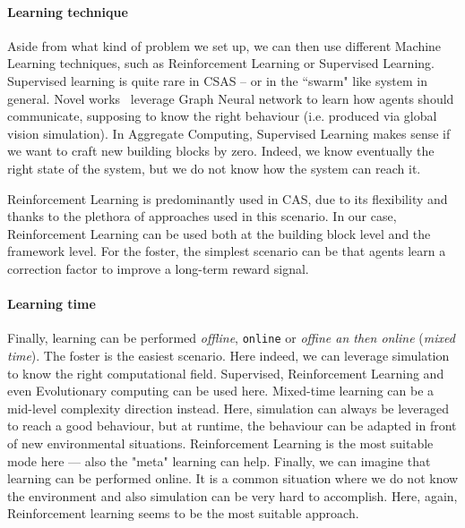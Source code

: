 \documentclass[conference]{IEEEtran}
\begin{document}
\paragraph{Learning technique}
Aside from what kind of problem we set up, we can then use different Machine Learning techniques,
 such as Reinforcement Learning or Supervised Learning.
%
Supervised learning is quite rare in CSAS -- or in the ``swarm" like system in general.
%
Novel works~\cite{DBLP:conf/corl/TolstayaGPP0R19} leverage Graph Neural network to learn how agents should communicate, supposing to know the right behaviour (i.e. produced via global vision simulation).
%
In Aggregate Computing, Supervised Learning makes sense if we want to craft new building blocks by zero. 
% 
Indeed, we know eventually the right state of the system, but we do not know how the system can reach it.

Reinforcement Learning is predominantly used in CAS, 
 due to its flexibility and thanks to the plethora of approaches used in this scenario.
% 
In our case, Reinforcement Learning can be used both at the building block level and the framework level.
%
For the foster, the simplest scenario can be that agents learn a correction factor to improve a long-term reward signal.
 
\paragraph{Learning time}
Finally, learning can be performed \textit{offline}, \texttt{online} or \textit{offine an then online} (\textit{mixed time}).
% 
The foster is the easiest scenario.
 Here indeed, we can leverage simulation to know the right computational field.
% 
Supervised, Reinforcement Learning and even Evolutionary computing can be used here.
%
Mixed-time learning can be a mid-level complexity direction instead.
 Here, simulation can always be leveraged to reach a good behaviour, but at runtime, the behaviour can be adapted in front of new environmental situations. 
%
Reinforcement Learning is the most suitable mode here --- also the "meta" learning can help.
%
Finally, we can imagine that learning can be performed online. 
 It is a common situation where we do not know the environment and also simulation can be very hard to accomplish. 
 Here, again, Reinforcement learning seems to be the most suitable approach.
\end{document}
